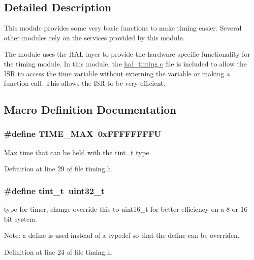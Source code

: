 \subsection{Detailed Description}
This module provides some very basic functions to make timing easier. Several other modules rely on the services provided by this module.

The module uses the H\+A\+L layer to provide the hardware specific functionality for the timing module. In this module, the \hyperlink{hal__timing_8c}{hal\+\_\+timing.\+c} file is included to allow the I\+S\+R to access the time variable without externing the variable or making a function call. This allows the I\+S\+R to be very efficient. 

\subsection{Macro Definition Documentation}
\hypertarget{group__timing_ga0540485394df82add6b7c4f2137c7f21}{}
\subsubsection[{T\+I\+M\+E\+\_\+\+M\+A\+X}]{\setlength{\rightskip}{0pt plus 5cm}\#define T\+I\+M\+E\+\_\+\+M\+A\+X~0x\+F\+F\+F\+F\+F\+F\+F\+F\+U}\label{group__timing_ga0540485394df82add6b7c4f2137c7f21}
Max time that can be held with the tint\+\_\+t type. 

Definition at line 29 of file timing.\+h.

\hypertarget{group__timing_gaef97c9386393beb1be4ed0b1513ee481}{}
\subsubsection[{tint\+\_\+t}]{\setlength{\rightskip}{0pt plus 5cm}\#define tint\+\_\+t~uint32\+\_\+t}\label{group__timing_gaef97c9386393beb1be4ed0b1513ee481}
type for timer, change override this to uint16\+\_\+t for better efficiency on a 8 or 16 bit system.

Note\+: a define is used instead of a typedef so that the define can be overriden. 

Definition at line 24 of file timing.\+h.



